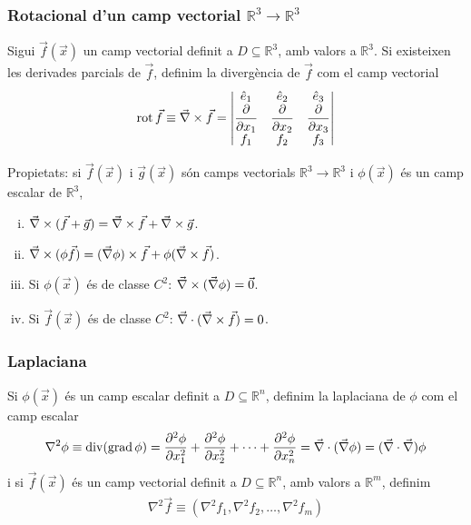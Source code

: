 \subsubsection*{Rotacional d'un camp vectorial $\mathbb{R}^{3} \to \mathbb{R}^{3}$}
\begin{defi}[Rotacional]
    Sigui $\vec{f}(\vec{x})$ un camp vectorial definit a $D \subseteq \mathbb{R}^{3}$, amb valors a $\mathbb{R}^{3}$. Si existeixen les derivades parcials de $\vec{f}$, definim la divergència de $\vec{f}$ com el camp vectorial
    \begin{align}
        \operatorname{rot} \vec{f} \equiv \vec{\nabla} \times \vec{f} = \begin{vmatrix} \hat{e}_{1} & \hat{e}_{2} & \hat{e}_{3} \\ \displaystyle \frac{\partial}{\partial x_{1}} & \displaystyle \frac{\partial}{\partial x_{2}} & \displaystyle \frac{\partial}{\partial x_{3}} \\ f_{1} & f_{2} & f_{3} \end{vmatrix}
    \end{align}
\end{defi}
Propietats: si $\vec{f}(\vec{x})$ i $\vec{g}(\vec{x})$ són camps vectorials $\mathbb{R}^{3} \to \mathbb{R}^{3}$ i $\phi (\vec{x})$ és un camp escalar de $\mathbb{R}^{3}$,
\begin{enumerate}[i)]
    \item $\vec{\nabla} \times (\vec{f} + \vec{g}) = \vec{\nabla} \times \vec{f} + \vec{\nabla} \times \vec{g}$.
    \item $\vec{\nabla} \times (\phi \vec{f}) = (\vec{\nabla} \phi) \times \vec{f} + \phi (\vec{\nabla} \times \vec{f})$.
    \item Si $\phi (\vec{x})$ és de classe $C^{2}$: $\vec{\nabla} \times (\vec{\nabla} \phi) = \vec{0}$.
    \item Si $\vec{f}(\vec{x})$ és de classe $C^{2}$: $\vec{\nabla} \cdot (\vec{\nabla} \times \vec{f}) = 0$. 
\end{enumerate}

\subsubsection*{Laplaciana}
\begin{defi}[Laplaciana]
    Si $\phi (\vec{x})$ és un camp escalar definit a $D \subseteq \mathbb{R}^{n}$, definim la laplaciana de $\phi$ com el camp escalar
    \begin{align}
        \nabla^{2} \phi \equiv \operatorname{div} (\operatorname{grad} \phi ) = \frac{\partial^{2} \phi}{\partial x_{1}^{2}} + \frac{\partial^{2} \phi}{\partial x_{2}^{2}} + \dots + \frac{\partial^{2} \phi}{\partial x_{n}^{2}}= \vec{\nabla} \cdot (\vec{\nabla} \phi) = (\vec{\nabla} \cdot \vec{\nabla}) \phi 
    \end{align}
    i si $\vec{f}(\vec{x})$ és un camp vectorial definit a $D \subseteq \mathbb{R}^{n}$, amb valors a $\mathbb{R}^{m}$, definim
    \begin{align}
        \nabla^{2} \vec{f} \equiv \left( \nabla^{2} f_{1}, \nabla^{2} f_{2}, \dots, \nabla^{2} f_{m} \right)
    \end{align}
\end{defi}
